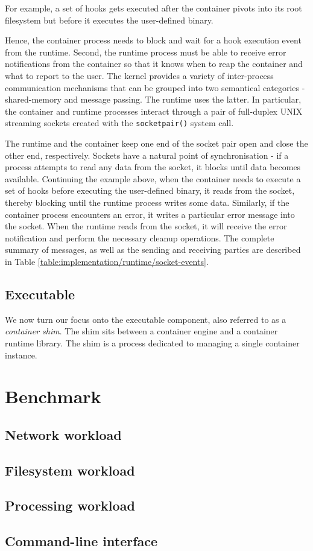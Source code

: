 For example, a set of hooks 
gets executed after the container pivots into its root filesystem but before it executes the user-defined 
binary. 

Hence, the container process needs to block and wait for a hook execution event from the 
runtime. Second, the runtime 
process must be able to receive error notifications from the container so that it knows 
when to reap the container and what to report to the user. The kernel provides a variety of 
inter-process communication mechanisms that can be grouped into two semantical categories - shared-memory 
and message passing. The runtime uses the latter. In particular, the container and runtime processes 
interact through a pair of full-duplex UNIX streaming sockets created with the \verb|socketpair()|
system call.

The runtime and the container keep one end of the socket pair open 
and close the other end, respectively. Sockets have a natural point of synchronisation - if a 
process attempts to read any data from the socket, it blocks until data becomes available. Continuing the 
example above, when the container needs to execute a set of hooks before executing the user-defined 
binary, it reads from the socket, thereby blocking until the runtime process writes some data. Similarly, if the 
container process encounters an error, it writes a particular error message into the socket.
When the runtime reads from the socket, it will receive the error notification and perform 
the necessary cleanup operations. The complete summary of messages, as well as the sending and 
receiving parties are described in Table \ref{table:implementation/runtime/socket-events}.

\subsection{Executable}
\label{ch:implementation/runtime/executable}
We now turn our focus onto the executable component, also referred to as a \textit{container shim}.
The shim sits between a container engine and a container runtime library. The shim is a process 
dedicated to managing a single container instance.

\section{Benchmark}
\label{ch:implementation/benchmark}
\subsection{Network workload}
\subsection{Filesystem workload}
\subsection{Processing workload}
\subsection{Command-line interface}
